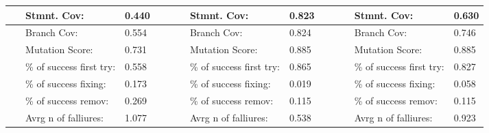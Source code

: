 \documentclass[a4paper,11pt,oneside]{memoir}
\begin{document}
\begin{table}[!ht]
{\begin{tabular}{|l|l|l|l|l|l|l|l|l|l|l|}
        ~ & Stmnt. Cov: & 0.440 & ~ & ~ & Stmnt. Cov: & 0.823 & ~ & ~ & Stmnt. Cov: & 0.630 \\ \hline
        ~ & Branch Cov: & 0.554 & ~ & ~ & Branch Cov: & 0.824 & ~ & ~ & Branch Cov: & 0.746 \\ \hline
        ~ & Mutation Score: & 0.731 & ~ & ~ & Mutation Score: & 0.885 & ~ & ~ & Mutation Score: & 0.885 \\ \hline
        ~ & \% of success first try: & 0.558 & ~ & ~ & \% of success first try: & 0.865 & ~ & ~ & \% of success first try: & 0.827 \\ \hline
        ~ & \% of success fixing: & 0.173 & ~ & ~ & \% of success fixing: & 0.019 & ~ & ~ & \% of success fixing: & 0.058 \\ \hline
        ~ & \% of success remov: & 0.269 & ~ & ~ & \% of success remov: & 0.115 & ~ & ~ & \% of success remov: & 0.115 \\ \hline
        ~ & Avrg n of falliures: & 1.077 & ~ & ~ & Avrg n of falliures: & 0.538 & ~ & ~ & Avrg n of falliures: & 0.923 \\ \hline
    \end{tabular}}
\end{table}
\end{document}

